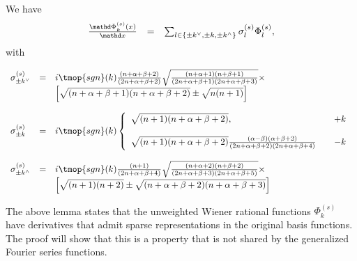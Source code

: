 \begin{lemma}
  \label{lemma:stiff2}We have
  \[ \begin{array}{lll}
       \frac{\mathd \Phi_k^{(s)} (x)}{\mathd x} & = & \sum_{l \in \left\{ \pm
       k^{\vee}, \pm k, \pm k^{\wedge} \right\}} \sigma_l^{(s)} \Phi_l^{(s)},
     \end{array} \]
  with
  
  
  \[ \begin{array}{lll}
       \sigma^{(s)}_{\pm k^{\vee}} & = & i \tmop{sgn} (k) \frac{(n + \alpha +
       \beta + 2)}{(2 n + \alpha + \beta + 2)} \sqrt{\frac{(n + \alpha + 1) (n
       + \beta + 1)}{(2 n + \alpha + \beta + 1) (2 n + \alpha + \beta + 3)}}
       \times\\
       &  &  \left[ \sqrt{(n + \alpha + \beta + 1) (n + \alpha + \beta + 2)}
       \pm \sqrt{n (n + 1)} \right]\\
       &  & \\
       \sigma_{\pm k}^{(s)} & = & i \tmop{sgn} (k) \left\{ \begin{array}{lll}
         \sqrt{(n + 1) (n + \alpha + \beta + 2)}, &  & + k\\
         &  & \\
         \sqrt{(n + 1) (n + \alpha + \beta + 2)}  \frac{(\alpha - \beta)
         (\alpha + \beta + 2)}{(2 n + \alpha + \beta + 2) (2 n + \alpha +
         \beta + 4)} &  & - k
       \end{array} \right.\\
       &  & \\
       \sigma_{\pm k^{\wedge}}^{(s)} & = & i \tmop{sgn} (k) \frac{(n + 1)}{(2
       n + \alpha + \beta + 4)} \sqrt{\frac{(n + \alpha + 2) (n + \beta +
       2)}{(2 n + \alpha + \beta + 3) (2 n + \alpha + \beta + 5)}} \times\\
       &  &  \left[ \sqrt{(n + 1) (n + 2)} \pm \sqrt{(n + \alpha + \beta + 2)
       (n + \alpha + \beta + 3)} \right]
     \end{array} \]
  
\end{lemma}

The above lemma states that the unweighted Wiener rational functions
$\Phi_k^{(s)}$ have derivatives that admit sparse representations in the
original basis functions. The proof will show that this is a property that is
not shared by the generalized Fourier series functions.

